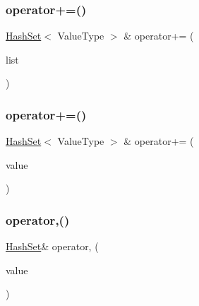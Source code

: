 \subsubsection{\texorpdfstring{operator+=()}{operator+=()}\hspace{0.1cm}{\footnotesize\ttfamily [2/3]}}
{\footnotesize\ttfamily \mbox{\hyperlink{classHashSet}{Hash\+Set}}$<$ Value\+Type $>$ \& operator+= (\begin{DoxyParamCaption}\item[{std\+::initializer\+\_\+list$<$ Value\+Type $>$}]{list }\end{DoxyParamCaption})}

\mbox{\label{classHashSet_af63b3438e0f32d7e2b5027974baa1780}} 
\subsubsection{\texorpdfstring{operator+=()}{operator+=()}\hspace{0.1cm}{\footnotesize\ttfamily [3/3]}}
{\footnotesize\ttfamily \mbox{\hyperlink{classHashSet}{Hash\+Set}}$<$ Value\+Type $>$ \& operator+= (\begin{DoxyParamCaption}\item[{const Value\+Type \&}]{value }\end{DoxyParamCaption})}

\mbox{\label{classHashSet_aac8aae69631b881ce37e9329b533b63d}} 
\subsubsection{\texorpdfstring{operator,()}{operator,()}}
{\footnotesize\ttfamily \mbox{\hyperlink{classHashSet}{Hash\+Set}}\& operator, (\begin{DoxyParamCaption}\item[{const Value\+Type \&}]{value }\end{DoxyParamCaption})\hspace{0.3cm}{\ttfamily [inline]}}

\mbox{\label{classHashSet_ae30cd1cfd4eb17df8f2d3c3991e2d383}} 
